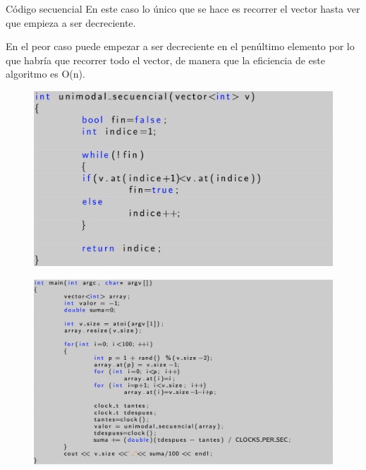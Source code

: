 \documentclass[12pt]{beamer}
\begin{document}
\begin{frame}{Código secuencial}
En este caso lo único que se hace es recorrer el vector hasta ver que empieza a ser decreciente.

\vspace{5mm} %

En el peor caso puede empezar a ser decreciente en el penúltimo elemento por lo que habría que recorrer todo el vector, de manera que la eficiencia de este algoritmo es O(n).
\end{frame}

\begin{frame}

\begin{figure}[H] 
\centering
\includegraphics[angle=0,scale=0.35]{img/3.png} 
\label{etiqueta} 
\end{figure}

\end{frame}

\begin{frame}

\begin{figure}[H] 
\centering
\includegraphics[angle=0,scale=0.35]{img/4.png} 
\label{etiqueta} 
\end{figure}

\end{frame}
\end{document}
